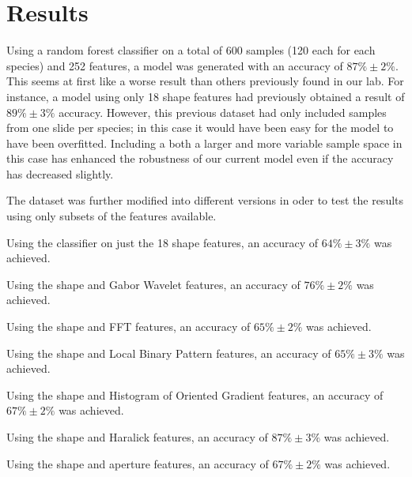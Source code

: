 \section{Results}

Using a random forest classifier on a total of 600 samples (120 each for each species) and 252 features, a model was generated with an accuracy of $87\% \pm 2\%$. This seems at first like a worse result than others previously found in our lab. For instance, a model using only 18 shape features had previously obtained a result of $89\% \pm 3\%$ accuracy. However, this previous dataset had only included samples from one slide per species; in this case it would have been easy for the model to have been overfitted. Including a both a larger and more variable sample space in this case has enhanced the robustness of our current model even if the accuracy has decreased slightly.

The dataset was further modified into different versions in oder to test the results using only subsets of the features available.

Using the classifier on just the 18 shape features, an accuracy of  $64\% \pm 3\%$ was achieved.

Using the shape and Gabor Wavelet features, an accuracy of $76\% \pm 2\%$ was achieved.

Using the shape and FFT features, an accuracy of $65\% \pm 2\%$ was achieved.

Using the shape and Local Binary Pattern features, an accuracy of $65\% \pm 3\%$ was achieved.

Using the shape and Histogram of Oriented Gradient features, an accuracy of $67\% \pm 2\%$ was achieved.

Using the shape and Haralick features, an accuracy of $87\% \pm 3\%$ was achieved.

Using the shape and aperture features, an accuracy of $67\% \pm 2\%$ was achieved.

  
  
  
  